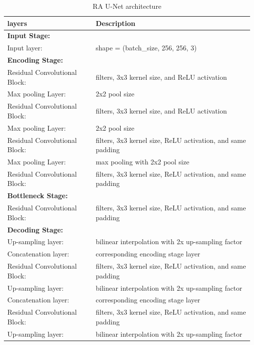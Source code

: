 \documentclass[12pt,oneside,openright,a4paper]{cpe-thai-project}
\begin{document}
\begin{itemize}
\begin{table}[!h]
\begin{tabular}{p{}>{\raggedright\arraybackslash}p{}}
\hline
\end{tabular}
\end{table}

\begin{table}[!h]
\centering
\caption{RA U-Net architecture}\label{tbl:raunetarchitech}
\begin{tabular}{p{}>{\raggedright\arraybackslash}p{}}
\toprule
layers  & Description  \\ \midrule
\textbf{Input Stage:} & \\
\quad Input layer: & shape = (batch\_size, 256, 256, 3) \\ 
\textbf{Encoding Stage:} & \\
\quad Residual Convolutional Block: &  64 filters, 3x3 kernel size, and ReLU activation \\
\quad Max pooling Layer: & 2x2 pool size \\
\quad Residual Convolutional Block: &  128 filters, 3x3 kernel size, and ReLU activation \\
\quad Max pooling Layer: &  2x2 pool size \\
\quad Residual Convolutional Block: &  256 filters, 3x3 kernel size, ReLU activation, and same padding \\
\quad Max pooling Layer: &  max pooling with 2x2 pool size \\
\quad Residual Convolutional Block: &  512 filters, 3x3 kernel size, ReLU activation, and same padding \\
\textbf{Bottleneck Stage:} & \\
\quad Residual Convolutional Block: &  1024 filters, 3x3 kernel size, ReLU activation, and same padding \\
\textbf{Decoding Stage:} & \\
\quad Up-sampling layer: &  bilinear interpolation with 2x up-sampling factor \\
\quad Concatenation layer: &  corresponding encoding stage layer \\
\quad Residual Convolutional Block: &  512 filters, 3x3 kernel size, ReLU activation, and same padding \\
\quad Up-sampling layer: &  bilinear interpolation with 2x up-sampling factor \\
\quad Concatenation layer: &  corresponding encoding stage layer \\
\quad Residual Convolutional Block: &  256 filters, 3x3 kernel size, ReLU activation, and same padding \\
\quad Up-sampling layer: &  bilinear interpolation with 2x up-sampling factor \\

\end{tabular}
\end{table}
\end{itemize}
\end{document}
